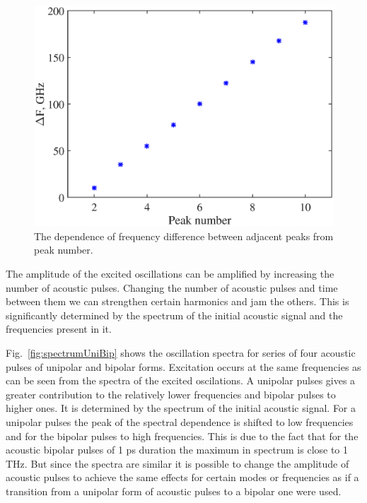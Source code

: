 \documentclass[%
superscriptaddress,
preprint,
showpacs,
amsmath,
amssymb,
aps,
prl,
]{revtex4-1}
\begin{document}
\begin{figure}[ht]
	\centering
	\includegraphics[width=0.95\columnwidth]{dF_regularity.eps}
	\caption{The dependence of frequency difference between adjacent peaks from peak number.}
	\label{fig:dF_regularity}
\end{figure}
	
The amplitude of the excited oscillations can be amplified by increasing the number of acoustic pulses. Changing the number of acoustic pulses and time between them we can strengthen certain harmonics and jam the others. This is significantly determined by the spectrum of the initial acoustic signal and the frequencies present in it.
	
Fig.~\ref{fig:spectrumUniBip} shows the oscillation spectra for series of four acoustic pulses of unipolar and bipolar forms. Excitation occurs at the same frequencies as can be seen from the spectra of the excited oscilations. A unipolar pulses gives a greater contribution to the relatively lower frequencies and bipolar pulses to higher ones. It is determined by the spectrum of the initial acoustic signal. For a unipolar pulses the peak of the spectral dependence is shifted to low frequencies and for the bipolar pulses to high frequencies. This is due to the fact that for the acoustic bipolar pulses of 1 ps duration the maximum in spectrum is close to 1 THz. But since the spectra are similar it is possible to change the amplitude of acoustic pulses to achieve the same effects for certain modes or frequencies as if a transition from a unipolar form of acoustic pulses to a bipolar one were used.
	
\end{document}
